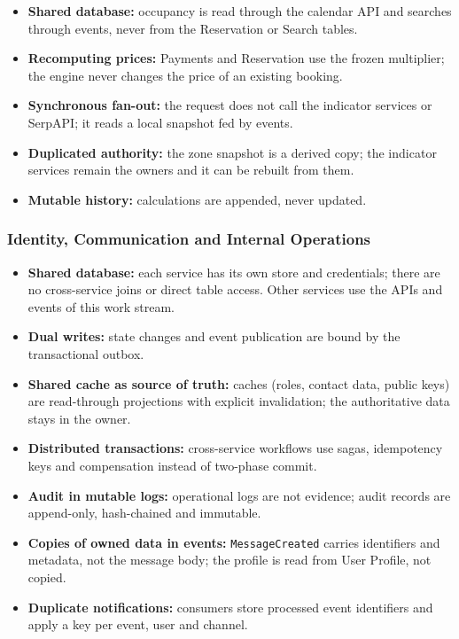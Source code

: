 \begin{itemize}
  \item \textbf{Shared database:} occupancy is read through the calendar API
    and searches through events, never from the Reservation or Search tables.
  \item \textbf{Recomputing prices:} Payments and Reservation use the frozen
    multiplier; the engine never changes the price of an existing booking.
  \item \textbf{Synchronous fan-out:} the request does not call the indicator
    services or SerpAPI; it reads a local snapshot fed by events.
  \item \textbf{Duplicated authority:} the zone snapshot is a derived copy;
    the indicator services remain the owners and it can be rebuilt from them.
  \item \textbf{Mutable history:} calculations are appended, never updated.
\end{itemize}
\endgroup

\begingroup
\setlength{\emergencystretch}{3em}
\subsubsection{Identity, Communication and Internal Operations}
\label{sec:id-antipatterns}

\begin{itemize}
  \item \textbf{Shared database:} each service has its own store and
    credentials; there are no cross-service joins or direct table access.
    Other services use the APIs and events of this work stream.
  \item \textbf{Dual writes:} state changes and event publication are bound
    by the transactional outbox.
  \item \textbf{Shared cache as source of truth:} caches (roles, contact
    data, public keys) are read-through projections with explicit
    invalidation; the authoritative data stays in the owner.
  \item \textbf{Distributed transactions:} cross-service workflows use sagas,
    idempotency keys and compensation instead of two-phase commit.
  \item \textbf{Audit in mutable logs:} operational logs are not evidence;
    audit records are append-only, hash-chained and immutable.
  \item \textbf{Copies of owned data in events:} \texttt{Message\allowbreak Created}
    carries identifiers and metadata, not the message body; the profile is
    read from User Profile, not copied.
  \item \textbf{Duplicate notifications:} consumers store processed event
    identifiers and apply a key per event, user and channel.
\end{itemize}

